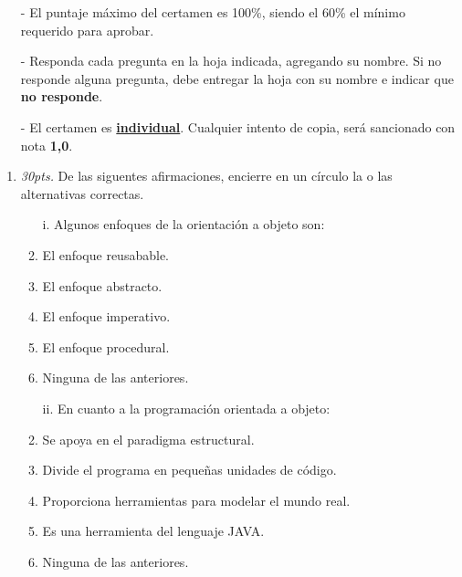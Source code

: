 \documentclass[10pt]{article}
\begin{document}
{\scriptsize
\begin{itemize}
    \item[-] El puntaje m\'aximo del certamen es 100\%, siendo el 60\% el m\'inimo requerido para aprobar.
    \item[-] Responda cada pregunta en la hoja indicada, agregando su nombre. Si no responde alguna pregunta, debe entregar la hoja con su nombre e indicar que \textbf{no responde}.
    \item[-] El certamen es \underline{\textbf{individual}}. Cualquier intento de copia, ser\'a sancionado con nota \textbf{1,0}.
\end{itemize}
\vspace*{10pt}

\vspace*{-30pt}

\begin{enumerate}

    \item \emph{30pts.} De las siguentes afirmaciones, encierre en un c\'irculo la o las alternativas correctas.
    \begin{multicols}{2}

    \begin{enumerate}[label=(\alph*)]
        \item[i.] Algunos enfoques de la orientaci\'on a objeto son:
        \item El enfoque reusabable.
        \item El enfoque abstracto.
        \item El enfoque imperativo.
        \item El enfoque procedural.
        \item Ninguna de las anteriores.
    \end{enumerate}

    \begin{enumerate}[label=(\alph*)]
        \item[ii.] En cuanto a la programaci\'on orientada a objeto:
        \item Se apoya en el paradigma estructural.
        \item Divide el programa en peque\~nas unidades de c\'odigo.
        \item Proporciona herramientas para modelar el mundo real.
        \item Es una herramienta del lenguaje JAVA.
        \item Ninguna de las anteriores.
    \end{enumerate}


\end{multicols}
\end{enumerate}}
\end{document}
